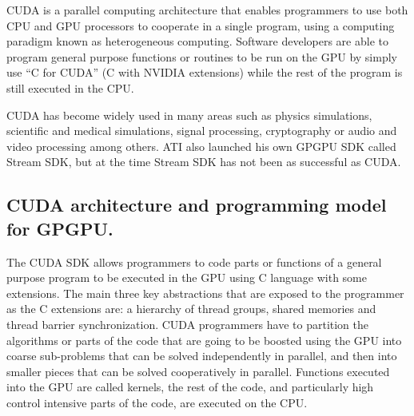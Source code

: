 \documentclass[thesis=M,english]{FITthesis}[2011/07/15]
\begin{document}
CUDA is a parallel computing architecture that enables programmers to use both CPU and GPU processors to cooperate in a single program, using a computing paradigm known as heterogeneous computing. Software developers are able to program general purpose functions or routines to be run on the GPU by simply use “C for CUDA” (C with NVIDIA extensions) while the rest of the program is still executed in the CPU. 

CUDA has become widely used in many areas such as physics simulations, scientific and medical simulations, signal processing, cryptography or audio and video processing among others. ATI also launched his own GPGPU SDK called Stream SDK, but at the time Stream SDK has not been as successful as CUDA.

\subsection{CUDA architecture and programming model for GPGPU.}

The CUDA SDK allows programmers to code parts or functions of a general purpose program to be executed in the GPU using C language with some extensions. The main three key abstractions that are exposed to the programmer as the C extensions are: a hierarchy of thread groups, shared memories and thread barrier synchronization. CUDA programmers have to partition the algorithms or parts of the code that are going to be boosted using the GPU into coarse sub-problems that can be solved independently in parallel, and then into smaller pieces that can be solved cooperatively in parallel. Functions executed into the GPU are called kernels, the rest of the code, and particularly
high control intensive parts of the code, are executed on the CPU. 
\end{document}
